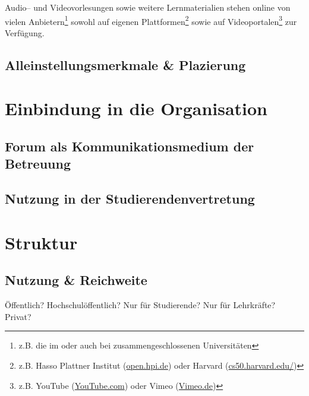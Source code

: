 Audio– und Videovorlesungen sowie weitere Lernmaterialien stehen online von vielen Anbietern\footnote{z.B. die im  oder auch bei  zusammengeschlossenen Universitäten} sowohl auf eigenen Plattformen\footnote{z.B. Hasso Plattner Institut (\url{open.hpi.de}) oder Harvard (\url{cs50.harvard.edu/})} sowie auf Videoportalen\footnote{z.B. YouTube (\url{YouTube.com}) oder Vimeo (\url{Vimeo.de})} zur Verfügung.

\subsection{Alleinstellungsmerkmale \& Plazierung} %
\label{sub:alleinstellungsmerkmale_plazierung}



\section{Einbindung in die Organisation} %
\label{sec:einbindung_in_die_organisation}

\subsection{Forum als Kommunikationsmedium der Betreuung} %
\label{sub:forum_als_kommunikationsmedium_der_betreuung}


\subsection{Nutzung in der Studierendenvertretung} %
\label{sub:nutzung_in_der_studierendenvertretung}



\section{Struktur} %
\label{sec:struktur}

\subsection{Nutzung \& Reichweite} %
\label{sub:reichweite}
Öffentlich? Hochschulöffentlich? Nur für Studierende? Nur für Lehrkräfte? Privat?

